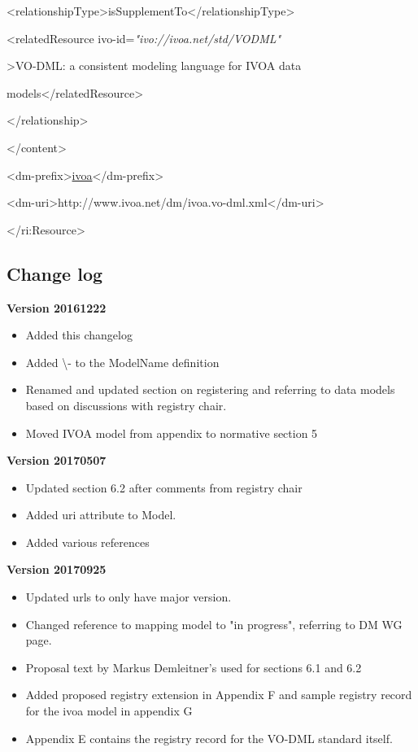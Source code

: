\documentclass[10pt,a4paper]{ivoa}
\begin{document}
\textless relationshipType\textgreater isSupplementTo\textless/relationshipType\textgreater{}

\textless relatedResource ivo-id=\emph{"ivo://ivoa.net/std/VODML"}

\textgreater VO-DML: a consistent modeling language for IVOA data

models\textless/relatedResource\textgreater{}

\textless/relationship\textgreater{}

\textless/content\textgreater{}

\textless dm-prefix\textgreater{}\uline{ivoa}\textless/dm-prefix\textgreater{}

\textless dm-uri\textgreater http://www.ivoa.net/dm/ivoa.vo-dml.xml\textless/dm-uri\textgreater{}

\textless/ri:Resource\textgreater{}

\hypertarget{change-log}{%
\subsection{Change log}\label{change-log}}

\textbf{Version 20161222}

\begin{itemize}
\item
  Added this changelog
\item
  Added \textbackslash- to the ModelName definition
\item
  Renamed and updated section on registering and referring to data
  models based on discussions with registry chair.
\item
  Moved IVOA model from appendix to normative section 5
\end{itemize}

\textbf{Version 20170507}

\begin{itemize}
\item
  Updated section 6.2 after comments from registry chair
\item
  Added uri attribute to Model.
\item
  Added various references
\end{itemize}

\textbf{Version 20170925}

\begin{itemize}
\item
  Updated urls to only have major version.
\item
  Changed reference to mapping model to "in progress", referring to DM
  WG page.
\item
  Proposal text by Markus Demleitner's used for sections 6.1 and 6.2
\item
  Added proposed registry extension in Appendix F and sample registry
  record for the ivoa model in appendix G
\item
  Appendix E contains the registry record for the VO-DML standard
  itself.
\end{itemize}
\end{document}
